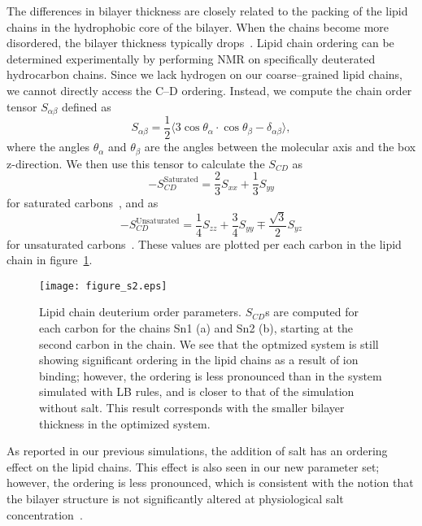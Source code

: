 The differences in bilayer thickness are closely related to the
packing of the lipid chains in the hydrophobic core of the bilayer. 
When the chains become more disordered, 
the bilayer thickness typically drops~\cite{nagle:2000}. 
Lipid chain ordering can be determined experimentally by performing NMR 
on specifically deuterated hydrocarbon chains. 
Since we lack hydrogen on our coarse--grained lipid chains, 
we cannot directly access the C--D ordering. 
Instead, we compute the chain order tensor $S_{\alpha\beta}$ defined as
\begin{equation}
    S_{\alpha\beta}=\frac{1}{2}\big\langle
    3\cos{\theta_\alpha}\cdot\cos{\theta_\beta}-\delta_{\alpha\beta}\big\rangle,
    \nonumber
\end{equation}
where the angles $\theta_\alpha$ and $\theta_\beta$ are the angles between the molecular
axis and the box z-direction. 
We then use this tensor to calculate the $S_{CD}$ as
\begin{equation}
    -S_{CD}^{\text{Saturated}}=\frac{2}{3}S_{xx}+\frac{1}{3}S_{yy}
\end{equation}
for saturated carbons~\cite{egberts:1988}, and as
\begin{equation}
-S_{CD}^{\text{Unsaturated}}=\frac{1}{4}S_{zz}+\frac{3}{4}S_{yy}\mp \frac{\sqrt{3}}{2}S_{yz}
\end{equation}
for unsaturated carbons~\cite{Douliez:1995}.  
These values are plotted per each carbon in the lipid chain in figure~\ref{figch2:op}. 
\begin{figure}[h!tb]
    \caption[Lipid chain deuterium order parameters.]{ Lipid chain deuterium order parameters. $S_{CD}$s are computed for each carbon
        for the chains Sn1 (a) and Sn2 (b), starting at the second carbon in the chain. We see that the optmized system is still showing significant ordering in the lipid
    chains as a result of ion binding; however, the ordering is less pronounced than in the system simulated with LB rules, 
    and is closer to that of the simulation without salt. This
result corresponds with the smaller bilayer thickness in the optimized system.
}
    \label{figch2:op}
    \texttt{[image: figure\_s2.eps]}
\end{figure}
As reported in our previous simulations, 
the addition of salt has an ordering effect on the lipid chains. 
This effect is also seen in our new parameter set; however, the ordering is less pronounced, 
which is consistent with the notion that the bilayer structure is not significantly altered 
at physiological salt concentration~\cite{pabst:2007,petrache:2006:swelling}.

